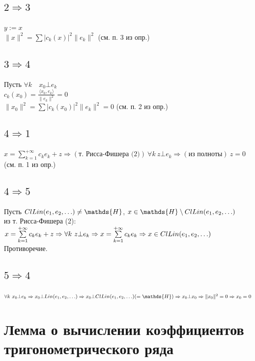 \documentclass[paper=a4, fontsize=17pt]{article}
\begin{document}
\subsection{\texorpdfstring{$2 \Rightarrow 3$}{TEXT}}
$y:=x$\\
$\|x\|^2=\sum \vert c_k(x) \vert ^2 \|e_k\|^2$ (см. п. 3 из опр.)

\subsection{\texorpdfstring{$3 \Rightarrow 4$}{TEXT}}
Пусть $\forall k \quad x_0 \bot e_k$\\
$c_k(x_0)=\frac{\langle x_0, e_k \rangle}{\|e_k\|^2}=0$\\
$\|x_0\|^2=\sum \vert c_k(x_0) \vert^2 \|e_k\|^2 = 0$ (см. п. 2 из опр.)

\subsection{\texorpdfstring{$4 \Rightarrow 1$}{TEXT}}
$x =\sum\limits_{k=1}^{+\infty} c_k e_k + z \Rightarrow(\text{т. Рисса-Фишера (2)}) \  \forall k \ z \bot e_k \Rightarrow(\text{из полноты}) \ z = 0$ (см. п. 1 из опр.)

\subsection{\texorpdfstring{$4 \Rightarrow 5$}{TEXT}}
Пусть $Cl Lin(e_1, e_2, \mathellipsis) \ne \mathds{H}$, $x \in \mathds{H} \setminus Cl Lin(e_1, e_2, \mathellipsis)$\\
из т. Рисса-Фишера (2): $x =\sum\limits_{k=1}^{+\infty} c_k e_k + z \Rightarrow \forall k \ z \bot e_k \Rightarrow x =\sum\limits_{k=1}^{+\infty} c_k e_k \Rightarrow x \in Cl Lin(e_1, e_2, \mathellipsis)$\\
Противоречие.

\subsection{\texorpdfstring{$5 \Rightarrow 4$}{TEXT}}
$\forall k \ x_0 \bot e_k \Rightarrow x_0 \bot Lin(e_1, e_2, \mathellipsis) \Rightarrow x_0 \bot Cl Lin(e_1, e_2, \mathellipsis)( = \mathds{H}) \Rightarrow x_0 \bot x_0 \Rightarrow \|x_0\|^2 = 0 \Rightarrow x_0 = 0$

\section{Лемма о вычислении коэффициентов тригонометрического ряда}
\end{document}
